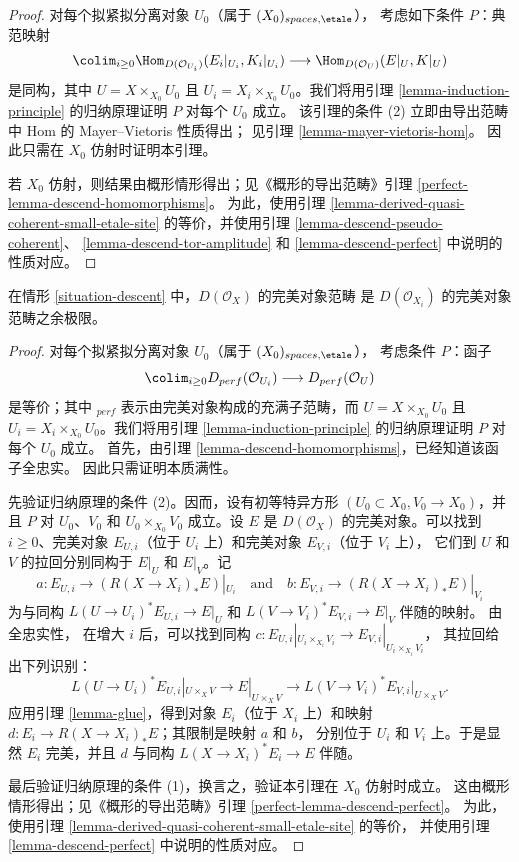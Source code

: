 \begin{proof}
对每个拟紧拟分离对象 $U_0$（属于 $(X_0)_{spaces, \etale}$），
考虑如下条件 $P$：典范映射
$$
\colim_{i \geq 0} \Hom_{D(\mathcal{O}_{U_i})}(E_i|_{U_i}, K_i|_{U_i})
\longrightarrow
\Hom_{D(\mathcal{O}_U)}(E|_U, K|_U)
$$
是同构，其中 $U = X \times_{X_0} U_0$ 且
$U_i = X_i \times_{X_0} U_0$。我们将用引理
\ref{lemma-induction-principle} 的归纳原理证明 $P$ 对每个 $U_0$ 成立。
该引理的条件 (2) 立即由导出范畴中 Hom 的 Mayer--Vietoris 性质得出；
见引理 \ref{lemma-mayer-vietoris-hom}。
因此只需在 $X_0$ 仿射时证明本引理。

\medskip\noindent
若 $X_0$ 仿射，则结果由概形情形得出；见《概形的导出范畴》引理
\ref{perfect-lemma-descend-homomorphisms}。
为此，使用引理 \ref{lemma-derived-quasi-coherent-small-etale-site}
的等价，并使用引理
\ref{lemma-descend-pseudo-coherent}、
\ref{lemma-descend-tor-amplitude} 和
\ref{lemma-descend-perfect} 中说明的性质对应。
\end{proof}

\begin{lemma}
\label{lemma-perfect-on-limit}
在情形 \ref{situation-descent} 中，$D(\mathcal{O}_X)$ 的完美对象范畴
是 $D(\mathcal{O}_{X_i})$ 的完美对象范畴之余极限。
\end{lemma}

\begin{proof}
对每个拟紧拟分离对象 $U_0$（属于 $(X_0)_{spaces, \etale}$），
考虑条件 $P$：函子
$$
\colim_{i \geq 0} D_{perf}(\mathcal{O}_{U_i})
\longrightarrow
D_{perf}(\mathcal{O}_U)
$$
是等价；其中 ${}_{perf}$ 表示由完美对象构成的充满子范畴，而
$U = X \times_{X_0} U_0$ 且
$U_i = X_i \times_{X_0} U_0$。我们将用引理
\ref{lemma-induction-principle} 的归纳原理证明 $P$ 对每个 $U_0$ 成立。
首先，由引理 \ref{lemma-descend-homomorphisms}，已经知道该函子全忠实。
因此只需证明本质满性。

\medskip\noindent
先验证归纳原理的条件 (2)。因而，设有初等特异方形
$(U_0 \subset X_0, V_0 \to X_0)$，并且 $P$ 对
$U_0$、$V_0$ 和 $U_0 \times_{X_0} V_0$ 成立。设 $E$ 是
$D(\mathcal{O}_X)$ 的完美对象。可以找到 $i \geq 0$、完美对象
$E_{U, i}$（位于 $U_i$ 上）和完美对象 $E_{V, i}$（位于 $V_i$ 上），
它们到 $U$ 和 $V$ 的拉回分别同构于
$E|_U$ 和 $E|_V$。记
$$
a : E_{U, i} \to (R(X \to X_i)_*E)|_{U_i}
\quad\text{and}\quad
b : E_{V, i} \to (R(X \to X_i)_*E)|_{V_i}
$$
为与同构 $L(U \to U_i)^*E_{U, i} \to E|_U$
和 $L(V \to V_i)^*E_{V, i} \to E|_V$ 伴随的映射。
由全忠实性，%
在增大 $i$ 后，可以找到同构
$c : E_{U, i}|_{U_i \times_{X_i} V_i} \to E_{V, i}|_{U_i \times_{X_i} V_i}$，
其拉回给出下列识别：
$$
L(U \to U_i)^*E_{U, i}|_{U \times_X V} \to E|_{U \times_X V} \to
L(V \to V_i)^*E_{V, i}|_{U \times_X V}.
$$
应用引理 \ref{lemma-glue}，得到对象 $E_i$（位于 $X_i$ 上）和映射
$d : E_i \to R(X \to X_i)_*E$；其限制是映射 $a$ 和 $b$，
分别位于 $U_i$ 和 $V_i$ 上。于是显然 $E_i$ 完美，并且
$d$ 与同构 $L(X \to X_i)^*E_i \to E$ 伴随。

\medskip\noindent
最后验证归纳原理的条件 (1)，换言之，验证本引理在 $X_0$ 仿射时成立。
这由概形情形得出；见《概形的导出范畴》引理
\ref{perfect-lemma-descend-perfect}。
为此，使用引理
\ref{lemma-derived-quasi-coherent-small-etale-site} 的等价，
并使用引理 \ref{lemma-descend-perfect} 中说明的性质对应。
\end{proof}


